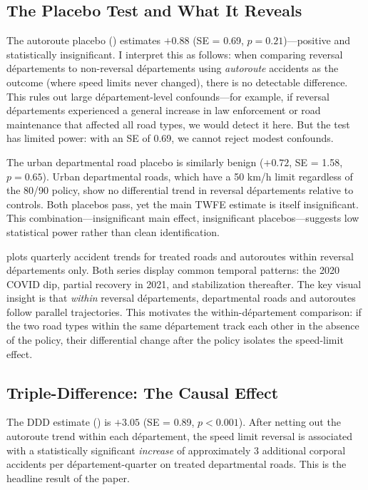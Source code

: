 \documentclass[12pt]{article}
\begin{document}
\subsection{The Placebo Test and What It Reveals}

The autoroute placebo () estimates $+0.88$ (SE = 0.69, $p = 0.21$)---positive and statistically insignificant. I interpret this as follows: when comparing reversal d\'{e}partements to non-reversal d\'{e}partements using \textit{autoroute} accidents as the outcome (where speed limits never changed), there is no detectable difference. This rules out large d\'{e}partement-level confounds---for example, if reversal d\'{e}partements experienced a general increase in law enforcement or road maintenance that affected all road types, we would detect it here. But the test has limited power: with an SE of 0.69, we cannot reject modest confounds.

The urban departmental road placebo is similarly benign ($+0.72$, SE = 1.58, $p = 0.65$). Urban departmental roads, which have a 50 km/h limit regardless of the 80/90 policy, show no differential trend in reversal d\'{e}partements relative to controls. Both placebos pass, yet the main TWFE estimate is itself insignificant. This combination---insignificant main effect, insignificant placebos---suggests low statistical power rather than clean identification.

 plots quarterly accident trends for treated roads and autoroutes within reversal d\'{e}partements only. Both series display common temporal patterns: the 2020 COVID dip, partial recovery in 2021, and stabilization thereafter. The key visual insight is that \textit{within} reversal d\'{e}partements, departmental roads and autoroutes follow parallel trajectories. This motivates the within-d\'{e}partement comparison: if the two road types within the same d\'{e}partement track each other in the absence of the policy, their differential change after the policy isolates the speed-limit effect.

\subsection{Triple-Difference: The Causal Effect}

The DDD estimate () is $+3.05$ (SE = 0.89, $p < 0.001$). After netting out the autoroute trend within each d\'{e}partement, the speed limit reversal is associated with a statistically significant \textit{increase} of approximately 3 additional corporal accidents per d\'{e}partement-quarter on treated departmental roads. This is the headline result of the paper.
\end{document}
